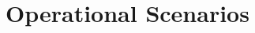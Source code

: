 \section{Operational Scenarios}
\subsection{}
\subsection{}
\subsection{}
\subsection{}
\subsection{}
\subsection{}
\subsection{}
\subsection{}